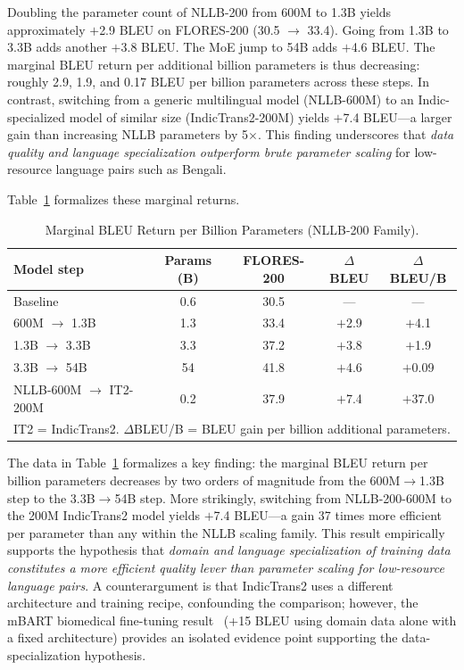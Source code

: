 \documentclass[conference]{IEEEtran}
\begin{document}
Doubling the parameter count of NLLB-200 from 600M to 1.3B yields
approximately $+$2.9 BLEU on FLORES-200 (30.5 $\to$ 33.4).
Going from 1.3B to 3.3B adds another $+$3.8 BLEU.
The MoE jump to 54B adds $+$4.6 BLEU.
The marginal BLEU return per additional billion parameters is thus
decreasing: roughly 2.9, 1.9, and 0.17 BLEU per billion parameters
across these steps.
In contrast, switching from a generic multilingual model (NLLB-600M)
to an Indic-specialized model of similar size (IndicTrans2-200M) yields
$+$7.4 BLEU---a larger gain than increasing NLLB parameters by 5$\times$.
This finding underscores that \textit{data quality and language
specialization outperform brute parameter scaling} for low-resource
language pairs such as Bengali.

Table~\ref{tab:marginal} formalizes these marginal returns.

\begin{table}[t]
\centering
\caption{Marginal BLEU Return per Billion Parameters (NLLB-200 Family).}
\label{tab:marginal}
\small
\begin{tabular}{lcccc}
\toprule
Model step & Params (B) & FLORES-200 & $\Delta$BLEU & $\Delta$BLEU/B \\
\midrule
Baseline              & 0.6 & 30.5 & ---    & ---   \\
600M $\to$ 1.3B       & 1.3 & 33.4 & $+$2.9 & $+$4.1 \\
1.3B $\to$ 3.3B       & 3.3 & 37.2 & $+$3.8 & $+$1.9 \\
3.3B $\to$ 54B        & 54  & 41.8 & $+$4.6 & $+$0.09 \\
\midrule
NLLB-600M $\to$ IT2-200M & 0.2 & 37.9 & $+$7.4 & $+$37.0 \\
\bottomrule
\multicolumn{5}{l}{\scriptsize IT2 = IndicTrans2. $\Delta$BLEU/B = BLEU gain per billion additional parameters.}
\end{tabular}
\end{table}

The data in Table~\ref{tab:marginal} formalizes a key finding: the marginal
BLEU return per billion parameters decreases by two orders of magnitude from
the 600M$\to$1.3B step to the 3.3B$\to$54B step.
More strikingly, switching from NLLB-200-600M to the 200M IndicTrans2 model
yields $+$7.4 BLEU---a gain 37 times more efficient per parameter than any
within the NLLB scaling family.
This result empirically supports the hypothesis that \textit{domain and language
specialization of training data constitutes a more efficient quality lever than
parameter scaling for low-resource language pairs}.
A counterargument is that IndicTrans2 uses a different architecture and training
recipe, confounding the comparison; however, the mBART biomedical fine-tuning
result~\cite{hasan2020low} (+15 BLEU using domain data alone with a fixed
architecture) provides an isolated evidence point supporting the
data-specialization hypothesis.
\end{document}
